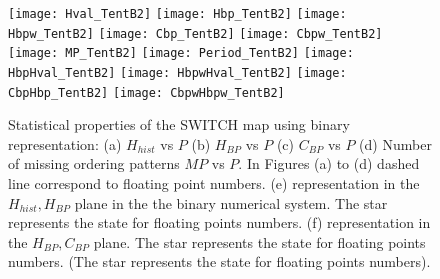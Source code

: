 
\begin{figure}
	\texttt{[image: Hval\_TentB2]}
	\texttt{[image: Hbp\_TentB2]}
	\texttt{[image: Hbpw\_TentB2]}
	\texttt{[image: Cbp\_TentB2]}
	\texttt{[image: Cbpw\_TentB2]}
	\texttt{[image: MP\_TentB2]}
	\texttt{[image: Period\_TentB2]}
	\texttt{[image: HbpHval\_TentB2]}
	\texttt{[image: HbpwHval\_TentB2]}
	\texttt{[image: CbpHbp\_TentB2]}
	\texttt{[image: CbpwHbpw\_TentB2]}
	\caption{Statistical properties of the SWITCH map using binary representation: (a) $H_{hist}$ vs $P$ (b) $H_{BP}$ vs $P$ (c) $C_{BP}$ vs $P$ (d) Number of missing ordering patterns $MP$ vs $P$. In Figures (a) to (d) dashed line correspond to floating point numbers. (e) representation in the $H_{hist},H_{BP}$ plane in the the binary numerical system.  The star represents the state for floating points numbers. (f) representation in the $H_{BP},C_{BP}$ plane.  The star represents the state for floating points numbers. (The star represents the state for floating points numbers). } \label{fig:seqbin}
\end{figure}


